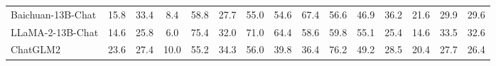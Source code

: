 \begin{table*}[t]
\begin{tabular}{l|ccc|ccccc|cccccc}
Baichuan-13B-Chat & 15.8          & 33.4          & 8.4           & 58.8          & 27.7          & 55.0          & 54.6          & 67.4          & 56.6          & 46.9          & 36.2          & 21.6          & 29.9          & 29.6          \\
LLaMA-2-13B-Chat  & 14.6          & 25.8          & 6.0           & 75.4          & 32.0          & 71.0          & 64.4          & 58.6          & 59.8          & 55.1          & 25.4          & 14.6          & 33.5          & 32.6          \\
ChatGLM2          & 23.6          & 27.4          & 10.0          & 55.2          & 34.3          & 56.0          & 39.8          & 36.4          & 76.2          & 49.2          & 28.5          & 20.4          & 27.7          & 26.4                            \\
\hline
\end{tabular}
\vspace{-3mm}
\label{few-1}
\end{table*}

